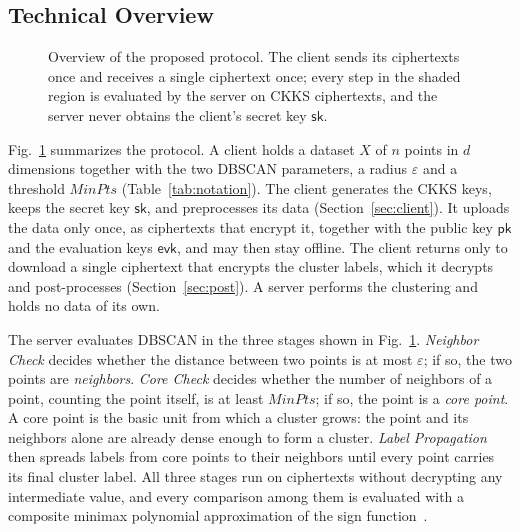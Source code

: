 \subsection{Technical Overview}
\label{sec:overview}
\label{sec:model}

\begin{figure}[t]
  \centering
  
  \caption{Overview of the proposed protocol. The client sends its
    ciphertexts once and receives a single ciphertext once; every step in
    the shaded region is evaluated by the server on CKKS ciphertexts, and the
    server never obtains the client's secret key $\mathsf{sk}$.}
  \label{fig:overview}
\end{figure}

Fig.~\ref{fig:overview} summarizes the protocol. A client holds a dataset
$X$ of $n$ points in $d$ dimensions together with the two DBSCAN
parameters, a radius $\varepsilon$ and a threshold $\mathit{MinPts}$
(Table~\ref{tab:notation}). The client generates the CKKS keys, keeps the
secret key $\mathsf{sk}$, and preprocesses its data
(Section~\ref{sec:client}). It uploads the data only once, as ciphertexts
that encrypt it, together with the public key $\mathsf{pk}$ and the
evaluation keys $\mathsf{evk}$, and may then stay offline. The client
returns only to download a single ciphertext that encrypts the cluster
labels, which it decrypts and post-processes (Section~\ref{sec:post}). A
server performs the clustering and holds no data of its own.

The server evaluates DBSCAN in the three stages shown in
Fig.~\ref{fig:overview}. \emph{Neighbor Check} decides whether the
distance between two points is at most $\varepsilon$; if so, the two
points are \emph{neighbors}. \emph{Core Check} decides whether the number
of neighbors of a point, counting the point itself, is at least
$\mathit{MinPts}$; if so, the point is a \emph{core point}. A core point
is the basic unit from which a cluster grows: the point and its neighbors
alone are already dense enough to form a cluster. \emph{Label
Propagation} then spreads labels from core points to their neighbors
until every point carries its final cluster label. All three stages run on
ciphertexts without decrypting any intermediate value, and every
comparison among them is evaluated with a composite minimax polynomial
approximation of the sign function~\cite{lee2021minimax}.

